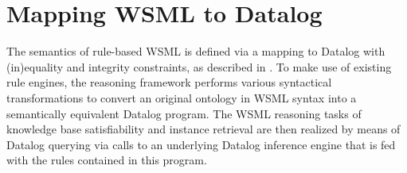 \newcommand{\smtxtit}[1]{\ensuremath{\textit{\scriptsize{#1}}}}
\newcommand{\trans}[1]{\ensuremath{\tau_{#1}}\xspace}
\newcommand{\transtxt}[1]{\trans{\smtxtit{#1}}}
\def\transax{\transtxt{axioms}}
\def\transnorm{\transtxt{norm}}
\def\translt{\transtxt{lt}}
\def\transdlog{\transtxt{datalog}}

\def\LE{\ensuremath{\mathcal{L\!E}}\xspace}
\def\O{\ensuremath{\mathcal{O}}\xspace}
\def\P{\ensuremath{\mathcal{P}}\xspace}
\newcommand{\powset}[1]{\ensuremath{2^{#1}}\xspace}
\def\lprl{\ensuremath{\;:\!-\:}}
\def\cstr{\ensuremath{\;!-\:}}
\def\qury{\ensuremath{\;?-\:}}
\def\dlogrule{\lprl}
\def\dlogcstr{\square\lprl}
\def\dlogand{\wedge}
\def\dlognot{\sim}
\newcommand{\dlogfact}[1]{\ensuremath{{#1}\;.}}

\newcommand{\predicate}[1]{\ensuremath{p_{#1}}\xspace}
\newcommand{\predsubtxt}[1]{\mathrm{\sf #1}}
\def\psco{\predicate{\predsubtxt{sco}}}
\def\pmo{\predicate{\predsubtxt{mo}}}
\def\phval{\predicate{\predsubtxt{hval}}}
\def\pitype{\predicate{\predsubtxt{itype}}}
\def\potype{\predicate{\predsubtxt{otype}}}
\def\mlaxioms{\ensuremath{P_{\smtxtit{meta}}}\xspace}

\newcommand{\typeof}{\ensuremath{typeOf}\xspace}

\def\bla{\textbf{{\sf bla}}\xspace}

\section{Mapping WSML to Datalog\label{sec:mapping}}

The semantics of rule-based WSML is defined via a mapping to
Datalog\cite{datalog} with (in)equality and integrity constraints,
as described in \cite{wsml-spec}. To make use of existing rule
engines, the reasoning framework performs various syntactical
transformations to convert an original ontology in WSML syntax
into a semantically equivalent Datalog program. The WSML reasoning
tasks of knowledge base satisfiability and instance retrieval are
then realized by means of Datalog querying via calls to an
underlying Datalog inference engine that is fed with the rules
contained in this program.





